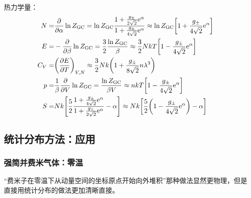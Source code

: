 热力学量：\begin{align*}
    N =   & \pdv{\alpha} \ln{Z_{\text{GC}}} = \ln{Z_{\text{GC}}} \frac{1 + \frac{g_{\pm}}{2 \sqrt{2}} \mathrm{e}^{\alpha}}{1 + \frac{g_{\pm}}{4 \sqrt{2}} \mathrm{e}^{\alpha}} \approx \ln{Z_{\text{GC}}} \qty[1 + \frac{g_{\pm}}{4 \sqrt{2}} \mathrm{e}^{\alpha}] \\
    E =   & - \pdv{\beta} \ln{Z_{\text{GC}}} = \frac{3}{2} \frac{\ln{Z_{\text{GC}}}}{\beta} \approx \frac{3}{2} N k T \qty[1 - \frac{g_{\pm}}{4 \sqrt{2}} \mathrm{e}^{\alpha}]                                                                                     \\
    C_V = & \qty(\pdv{E}{T})_{V, N} \approx \frac{3}{2} N k \qty(1 + \frac{g_{\pm}}{8 \sqrt{2}} n \lambda^3)                                                                                                                                                       \\
    p =   & \frac{1}{\beta} \pdv{V} \ln{Z_{\text{GC}}} = \frac{\ln{Z_{\text{GC}}}}{\beta V} \approx n k T \qty[1 - \frac{g_{\pm}}{4 \sqrt{2}} \mathrm{e}^{\alpha}]                                                                                                 \\
    S =   & N k \qty[\frac{5}{2} \frac{1 + \frac{g_{\pm}}{4 \sqrt{2}} \mathrm{e}^{\alpha}}{1 + \frac{g_{\pm}}{2 \sqrt{2}} \mathrm{e}^{\alpha}} - \alpha] \approx N k \qty[\frac{5}{2} \qty(1 - \frac{g_{\pm}}{4 \sqrt{2}} \mathrm{e}^{\alpha}) - \alpha]
\end{align*}

\subsection{统计分布方法：应用}

\subsubsection{强简并费米气体：零温}

“费米子在零温下从动量空间的坐标原点开始向外堆积”那种做法显然更物理，但是直接用统计分布的做法更加清晰直接。

